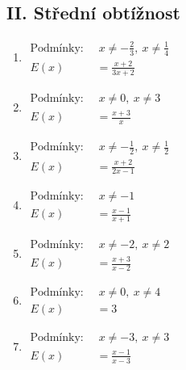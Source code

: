\documentclass[11pt,a4paper]{article}
\begin{document}
\subsection*{II. Střední obtížnost}
\begin{enumerate}[label={},itemsep=9pt]
\item[\textbf{E001}] \(\displaystyle \begin{aligned}\text{Podmínky: }&\ x\ne - \frac{2}{3},\ x\ne \frac{1}{4}\\ E(x)&=\frac{x + 2}{3x + 2}\end{aligned}\)\par
\item[\textbf{E003}] \(\displaystyle \begin{aligned}\text{Podmínky: }&\ x\ne 0,\ x\ne 3\\ E(x)&=\frac{x + 3}{x}\end{aligned}\)\par
\item[\textbf{E004}] \(\displaystyle \begin{aligned}\text{Podmínky: }&\ x\ne - \frac{1}{2},\ x\ne \frac{1}{2}\\ E(x)&=\frac{x + 2}{2x - 1}\end{aligned}\)\par
\item[\textbf{E005}] \(\displaystyle \begin{aligned}\text{Podmínky: }&\ x\ne -1\\ E(x)&=\frac{x - 1}{x + 1}\end{aligned}\)\par
\item[\textbf{E006}] \(\displaystyle \begin{aligned}\text{Podmínky: }&\ x\ne -2,\ x\ne 2\\ E(x)&=\frac{x + 3}{x - 2}\end{aligned}\)\par
\item[\textbf{E007}] \(\displaystyle \begin{aligned}\text{Podmínky: }&\ x\ne 0,\ x\ne 4\\ E(x)&=3\end{aligned}\)\par
\item[\textbf{E008}] \(\displaystyle \begin{aligned}\text{Podmínky: }&\ x\ne -3,\ x\ne 3\\ E(x)&=\frac{x - 1}{x - 3}\end{aligned}\)\par
\end{enumerate}
\end{document}
